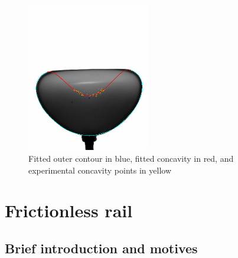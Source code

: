 
\begin{figure}[H] %
	\centering%
  \includegraphics[width=0.48\textwidth]{figures/Chapter_1/outer_contour_complete.png}
	\caption{Fitted outer contour in blue, fitted concavity in red, and experimental concavity points in yellow}
	\label{fig:fit_complet}
\end{figure}
\newpage
\section{Frictionless rail}
\subsection{Brief introduction and motives}
